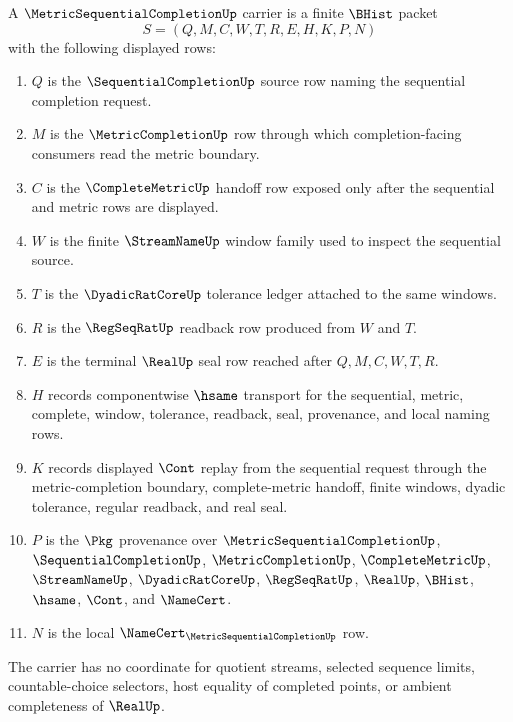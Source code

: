 \begin{definition}
\label{def:metric-sequential-completion-carrier}
A $\MetricSequentialCompletionUp$ carrier is a finite $\BHist$ packet
$$
S=(Q,M,C,W,T,R,E,H,K,P,N)
$$
with the following displayed rows:
\begin{enumerate}
\item $Q$ is the $\SequentialCompletionUp$ source row naming the sequential completion request.
\item $M$ is the $\MetricCompletionUp$ row through which completion-facing consumers read the metric boundary.
\item $C$ is the $\CompleteMetricUp$ handoff row exposed only after the sequential and metric rows are displayed.
\item $W$ is the finite $\StreamNameUp$ window family used to inspect the sequential source.
\item $T$ is the $\DyadicRatCoreUp$ tolerance ledger attached to the same windows.
\item $R$ is the $\RegSeqRatUp$ readback row produced from $W$ and $T$.
\item $E$ is the terminal $\RealUp$ seal row reached after $Q,M,C,W,T,R$.
\item $H$ records componentwise $\hsame$ transport for the sequential, metric, complete, window, tolerance, readback, seal, provenance, and local naming rows.
\item $K$ records displayed $\Cont$ replay from the sequential request through the metric-completion boundary, complete-metric handoff, finite windows, dyadic tolerance, regular readback, and real seal.
\item $P$ is the $\Pkg$ provenance over $\MetricSequentialCompletionUp$, $\SequentialCompletionUp$, $\MetricCompletionUp$, $\CompleteMetricUp$, $\StreamNameUp$, $\DyadicRatCoreUp$, $\RegSeqRatUp$, $\RealUp$, $\BHist$, $\hsame$, $\Cont$, and $\NameCert$.
\item $N$ is the local $\NameCert_{\MetricSequentialCompletionUp}$ row.
\end{enumerate}
The carrier has no coordinate for quotient streams, selected sequence limits, countable-choice selectors, host equality of completed points, or ambient completeness of $\RealUp$.
\end{definition}

